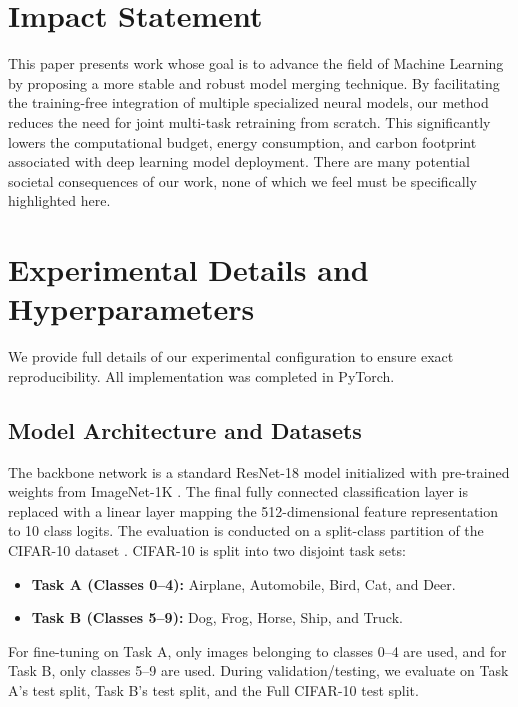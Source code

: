\documentclass{article}
\theoremstyle{plain}
\theoremstyle{definition}
\theoremstyle{remark}
\begin{document}
\section*{Impact Statement}
This paper presents work whose goal is to advance the field of Machine Learning by proposing a more stable and robust model merging technique. By facilitating the training-free integration of multiple specialized neural models, our method reduces the need for joint multi-task retraining from scratch. This significantly lowers the computational budget, energy consumption, and carbon footprint associated with deep learning model deployment. There are many potential societal consequences of our work, none of which we feel must be specifically highlighted here.

\nocite{*}



\clearpage
\appendix
\section{Experimental Details and Hyperparameters}
\label{app-hyperparameters}
We provide full details of our experimental configuration to ensure exact reproducibility. All implementation was completed in PyTorch.

\subsection{Model Architecture and Datasets}
The backbone network is a standard ResNet-18 model \cite{he2016deep} initialized with pre-trained weights from ImageNet-1K \cite{deng2009imagenet}. The final fully connected classification layer is replaced with a linear layer mapping the 512-dimensional feature representation to 10 class logits.
The evaluation is conducted on a split-class partition of the CIFAR-10 dataset \cite{krizhevsky2009learning}. CIFAR-10 is split into two disjoint task sets:
\begin{itemize}
    \item \textbf{Task A (Classes 0--4):} Airplane, Automobile, Bird, Cat, and Deer.
    \item \textbf{Task B (Classes 5--9):} Dog, Frog, Horse, Ship, and Truck.
\end{itemize}
For fine-tuning on Task A, only images belonging to classes 0--4 are used, and for Task B, only classes 5--9 are used. During validation/testing, we evaluate on Task A's test split, Task B's test split, and the Full CIFAR-10 test split.
\end{document}
